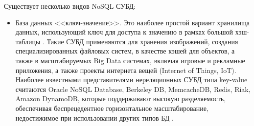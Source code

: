 \documentclass[14pt]{extreport}
\begin{document}
Существует несколько видов NoSQL СУБД:
\begin{itemize}
	
	\item База данных <<ключ-значение>>. Это наиболее простой вариант хранилища данных, использующий ключ для доступа к значению в рамках большой хэш-таблицы \cite{nosqlAws}. Такие СУБД применяются для хранения изображений, создания специализированных файловых систем, в качестве кэшей для объектов, а также в масштабируемых Big Data системах, включая игровые и рекламные приложения, а также проекты интернета вещей (Internet of Things, IoT). Наиболее известными представителями нереляционных СУБД типа key-value считаются Oracle NoSQL Database, Berkeley DB, MemcacheDB, Redis, Riak, Amazon DynamoDB, которые поддерживают высокую разделяемость, обеспечивая беспрецедентное горизонтальное масштабирование, недостижимое при использовании других типов БД \cite{nosqlTp}.
	

\end{itemize}
\end{document}
